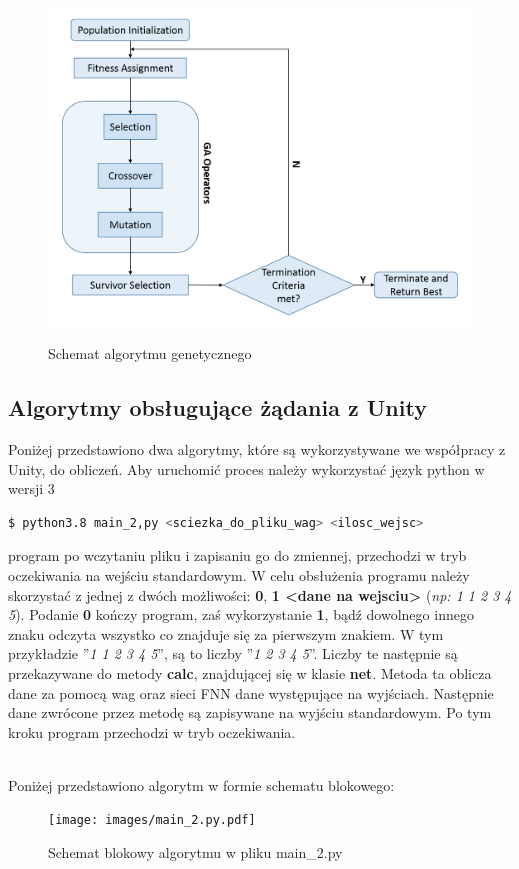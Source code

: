 \begin{figure}[H]
    \includegraphics[width=\textwidth]{images/ga_schema.png}
    \label{fig:ga}
    \caption{Schemat algorytmu genetycznego\cite{ai}}
\end{figure}
\clearpage

\subsection{Algorytmy obsługujące żądania z Unity}
Poniżej przedstawiono dwa algorytmy, które są wykorzystywane we współpracy z Unity, do obliczeń. Aby uruchomić proces należy wykorzystać język python w wersji 3

\begin{lstlisting}[language=sh, caption={Wywłanie programu}]
$ python3.8 main_2,py <sciezka_do_pliku_wag> <ilosc_wejsc>
\end{lstlisting}

program po wczytaniu pliku i zapisaniu go do zmiennej, przechodzi w tryb oczekiwania na wejściu standardowym. W celu obsłużenia programu należy skorzystać z jednej z dwóch możliwości: \textbf{0}, \textbf{1 <dane na wejsciu>} (\textit{np: 1 1 2 3 4 5}). Podanie \textbf{0} kończy program, zaś wykorzystanie \textbf{1}, bądź dowolnego innego znaku odczyta wszystko co znajduje się za pierwszym znakiem. W tym przykładzie ''\textit{1 1 2 3 4 5}'', są to liczby ''\textit{1 2 3 4 5}''. Liczby te następnie są przekazywane do metody \textbf{calc}, znajdującej się w klasie \textbf{net}. Metoda ta oblicza dane za pomocą wag oraz sieci FNN dane występujące na wyjściach. Następnie dane zwrócone przez metodę są zapisywane na wyjściu standardowym. Po tym kroku program przechodzi w tryb oczekiwania.
\clearpage

\clearpage

\ \\
Poniżej przedstawiono algorytm w formie schematu blokowego:
\begin{figure}[H]
    \texttt{[image: images/main\_2.py.pdf]}
    \caption{Schemat blokowy algorytmu w pliku main\_2.py}
    \label{fig:schemat}
\end{figure}